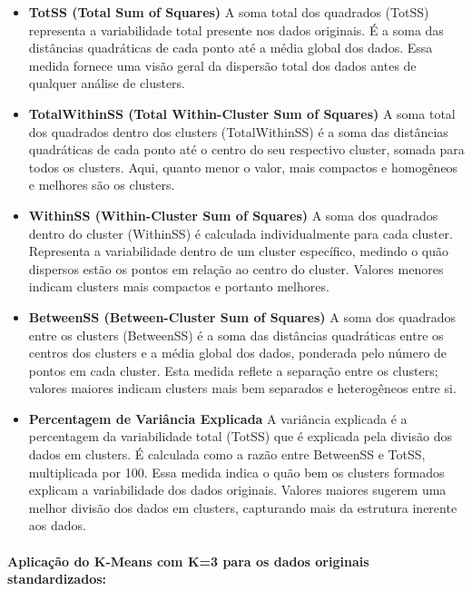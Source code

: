 \documentclass[
  letterpaper,
  DIV=11,
  numbers=noendperiod]{scrartcl}
\let\oldparagraph\paragraph
\renewcommand{\paragraph}[1]{\oldparagraph{#1}\mbox{}}
\begin{document}
\begin{itemize}
\item
  \textbf{TotSS (Total Sum of Squares)} A soma total dos quadrados
  (TotSS) representa a variabilidade total presente nos dados originais.
  É a soma das distâncias quadráticas de cada ponto até a média global
  dos dados. Essa medida fornece uma visão geral da dispersão total dos
  dados antes de qualquer análise de clusters.
\item
  \textbf{TotalWithinSS (Total Within-Cluster Sum of Squares)} A soma
  total dos quadrados dentro dos clusters (TotalWithinSS) é a soma das
  distâncias quadráticas de cada ponto até o centro do seu respectivo
  cluster, somada para todos os clusters. Aqui, quanto menor o valor,
  mais compactos e homogêneos e melhores são os clusters.
\item
  \textbf{WithinSS (Within-Cluster Sum of Squares)} A soma dos quadrados
  dentro do cluster (WithinSS) é calculada individualmente para cada
  cluster. Representa a variabilidade dentro de um cluster específico,
  medindo o quão dispersos estão os pontos em relação ao centro do
  cluster. Valores menores indicam clusters mais compactos e portanto
  melhores.
\item
  \textbf{BetweenSS (Between-Cluster Sum of Squares)} A soma dos
  quadrados entre os clusters (BetweenSS) é a soma das distâncias
  quadráticas entre os centros dos clusters e a média global dos dados,
  ponderada pelo número de pontos em cada cluster. Esta medida reflete a
  separação entre os clusters; valores maiores indicam clusters mais bem
  separados e heterogêneos entre si.
\item
  \textbf{Percentagem de Variância Explicada} A variância explicada é a
  percentagem da variabilidade total (TotSS) que é explicada pela
  divisão dos dados em clusters. É calculada como a razão entre
  BetweenSS e TotSS, multiplicada por 100. Essa medida indica o quão bem
  os clusters formados explicam a variabilidade dos dados originais.
  Valores maiores sugerem uma melhor divisão dos dados em clusters,
  capturando mais da estrutura inerente aos dados.
\end{itemize}

\paragraph{Aplicação do K-Means com K=3 para os dados originais
standardizados:}\label{aplicauxe7uxe3o-do-k-means-com-k3-para-os-dados-originais-standardizados}
\end{document}
